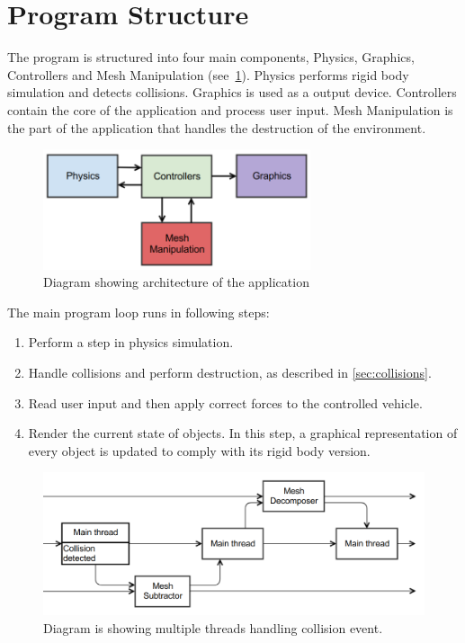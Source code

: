 \section{Program Structure}
The program is structured into four main components, Physics, Graphics, Controllers and Mesh Manipulation (see~\cref{fig:architecture}). Physics performs rigid body simulation and detects collisions. Graphics is used as a output device. Controllers contain the core of the application and process user input. Mesh Manipulation is the part of the application that handles the destruction of the environment.
\begin{figure}
        \centering
        \includegraphics[width=0.7\textwidth]{img/architecture}
        \caption{Diagram showing architecture of the application}
        \label{fig:architecture}
\end{figure}

\label{sec:structure}
The main program loop runs in following steps:
\begin{enumerate}
\item Perform a step in physics simulation.
\item Handle collisions and perform destruction, as described in  \cref{sec:collisions}.
\item Read user input and then apply correct forces to the controlled vehicle.
\item Render the current state of objects. In this step, a graphical representation of every object is updated to comply with its rigid body version.
\end{enumerate}

\begin{figure}
        \centering
        \includegraphics[width=\textwidth]{img/decompositionFlow}
        \caption{Diagram is showing multiple threads handling collision event. }
        \label{fig:threads}
\end{figure}

